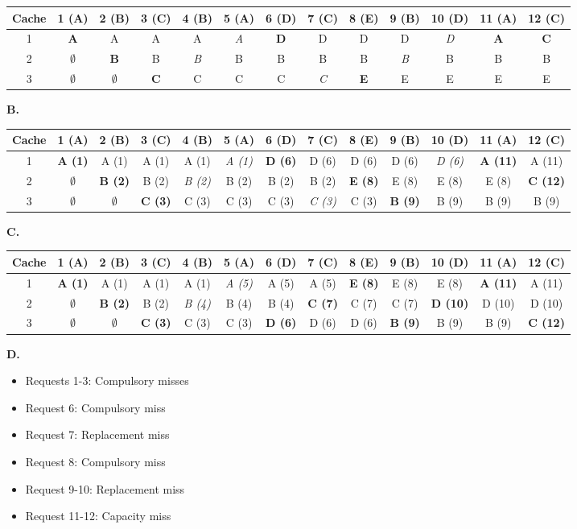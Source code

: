 \documentclass{exam}
\begin{document}
\begin{center}
\begin{tabular}{c|ccc ccc ccc ccc}
\textbf{Cache}& 1 (A) & 2 (B) & 3 (C) & 4 (B)& 5 (A)& 6 (D)& 7 (C)& 8 (E) & 9 (B) & 10 (D) & 11 (A)& 12 (C) \\ [0.5ex] 
 \hline\hline
1& \textbf{A} & A & A & A & \textit{A} & \textbf{D} & D & D & D & \textit{D} & \textbf{A} & \textbf{C}\\
2&$\emptyset$& \textbf{B} & B & \textit{B} & B & B & B & B & \textit{B} & B & B & B\\
3&$\emptyset$& $\emptyset$ & \textbf{C} & C & C & C & \textit{C} & \textbf{E} & E & E & E & E\\
\end{tabular}
\end{center}


\textbf{B.}

\begin{center}
\begin{tabular}{c|ccc ccc ccc ccc}
\textbf{Cache}& 1 (A) & 2 (B) & 3 (C) & 4 (B)& 5 (A)& 6 (D)& 7 (C)& 8 (E) & 9 (B) & 10 (D) & 11 (A)& 12 (C) \\ [0.5ex] 
 \hline\hline
1& \textbf{A (1)} & A (1) & A (1) & A (1) & \textit{A (1)} & \textbf{D (6)} & D (6) & D (6) & D (6) & \textit{D (6) }& \textbf{A (11)}& A (11)\\
2& $\emptyset$ & \textbf{B (2)} & B (2) & \textit{B (2)} & B (2) & B (2) & B (2) &\textbf{ E (8)} & E (8) & E (8)  & E (8) & \textbf{C (12)}\\
3&$\emptyset$ & $\emptyset$ & \textbf{C (3)} & C (3) & C (3) & C (3) &\textit{ C (3)} & C (3) & \textbf{B (9) }& B (9) & B (9) &  B (9)\\
\end{tabular}
\end{center}

\textbf{C.}

\begin{center}

\begin{tabular}{c|ccc ccc ccc ccc}
\textbf{Cache}& 1 (A) & 2 (B) & 3 (C) & 4 (B)& 5 (A)& 6 (D)& 7 (C)& 8 (E) & 9 (B) & 10 (D) & 11 (A)& 12 (C) \\ [0.5ex] 
 \hline\hline
1& \textbf{A (1)} & A (1) & A (1) & A (1) & \textit{A (5)} & A (5) & A (5) & \textbf{E (8)} & E (8) & E (8) &\textbf{ A (11)} & A (11)\\
2&$\emptyset$ & \textbf{B (2)} & B (2) & \textit{B (4)} & B (4) & B (4) & \textbf{C (7)} & C (7) & C (7) & \textbf{D (10)} & D (10) & D (10)\\
3&$\emptyset$& $\emptyset$ & \textbf{C (3)} & C (3) & C (3) & \textbf{D (6)} & D (6) & D (6) & \textbf{B (9)} & B (9) & B (9)& \textbf{C (12)}\\
\end{tabular}
\end{center}

\textbf{D.}

\begin{itemize}
\item Requests 1-3: Compulsory misses
\item Request 6: Compulsory miss
\item Request 7: Replacement miss
\item Request 8: Compulsory miss
\item Request 9-10: Replacement miss
\item Request 11-12: Capacity miss
\end{itemize}
\end{document}
